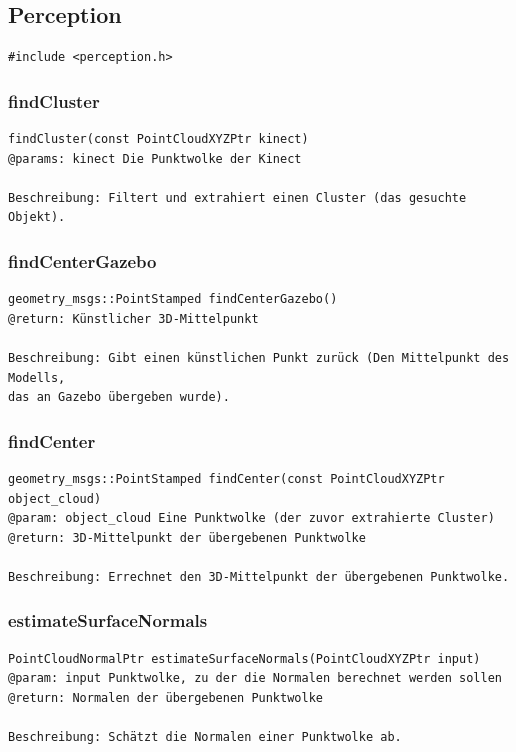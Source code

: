 \documentclass{suturo}
\begin{document}
\subsection{Perception}

\begin{verbatim}
#include <perception.h>
\end{verbatim}


\subsubsection{findCluster}
\begin{verbatim}
findCluster(const PointCloudXYZPtr kinect)
@params: kinect Die Punktwolke der Kinect

Beschreibung: Filtert und extrahiert einen Cluster (das gesuchte Objekt).
\end{verbatim}\label{func:findcluster}

\subsubsection{findCenterGazebo}
\begin{verbatim}
geometry_msgs::PointStamped findCenterGazebo()
@return: Künstlicher 3D-Mittelpunkt

Beschreibung: Gibt einen künstlichen Punkt zurück (Den Mittelpunkt des Modells, 
das an Gazebo übergeben wurde).
\end{verbatim}\label{func:findcentergazebo}


\subsubsection{findCenter}
\begin{verbatim}
geometry_msgs::PointStamped findCenter(const PointCloudXYZPtr object_cloud)
@param: object_cloud Eine Punktwolke (der zuvor extrahierte Cluster)
@return: 3D-Mittelpunkt der übergebenen Punktwolke

Beschreibung: Errechnet den 3D-Mittelpunkt der übergebenen Punktwolke.
\end{verbatim}\label{func:findcenter}

\subsubsection{estimateSurfaceNormals}
\begin{verbatim}
PointCloudNormalPtr estimateSurfaceNormals(PointCloudXYZPtr input)
@param: input Punktwolke, zu der die Normalen berechnet werden sollen
@return: Normalen der übergebenen Punktwolke

Beschreibung: Schätzt die Normalen einer Punktwolke ab.
\end{verbatim}\label{func:estimatesurfacenormals}
\end{document}
